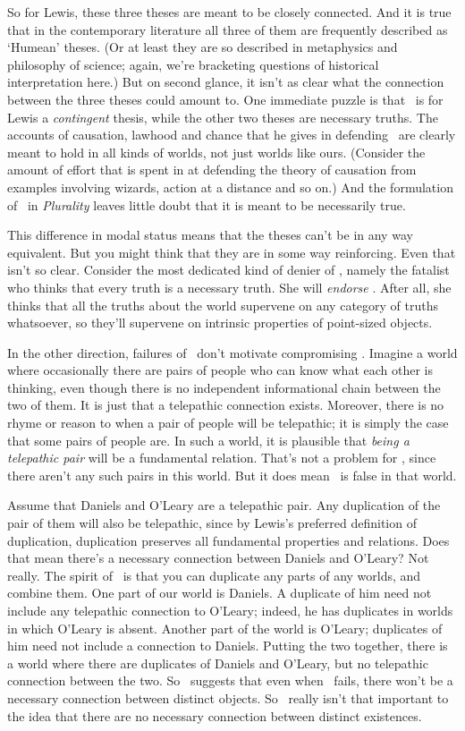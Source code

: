 \noindent So for Lewis, these three theses  are meant to be closely connected.  And it is true that in the contemporary literature all three of them are frequently described as `Humean' theses. (Or at least they are so described in metaphysics and philosophy of science; again, we're bracketing questions of historical interpretation here.) But on second glance, it isn't as clear what the connection between the three theses could amount to. One immediate puzzle is that \HS\ is for Lewis a \textit{contingent} thesis, while the other two theses are necessary truths. The accounts of causation, lawhood and chance that he gives in defending \NR\ are clearly meant to hold in all kinds of worlds, not just worlds like ours. (Consider the amount of effort that is spent in \citet{Lewis2004a} at defending the theory of causation from examples involving wizards, action at a distance and so on.) And  the formulation of \MC\ in \textit{Plurality} leaves  little doubt that it is meant to be necessarily true.

This difference in modal status means that the theses can't be in any way equivalent. But you might think that they are in some way reinforcing. Even that isn't so clear. Consider the most dedicated kind of denier of \MC, namely the fatalist who thinks that every truth is a necessary truth. She will \textit{endorse} \HS. After all, she thinks that all the truths about the world supervene on any category of truths whatsoever, so they'll supervene on intrinsic properties of point-sized objects.

In the other direction, failures of \HS\ don't motivate compromising \MC. Imagine a world where occasionally there are pairs of people who can know what each other is thinking, even though there is no independent informational chain between the two of them. It is just that a telepathic connection exists. Moreover, there is no rhyme or reason to when a pair of people will be telepathic; it is simply the case that some pairs of people are. In such a world, it is plausible that \textit{being a telepathic pair} will be a fundamental relation. That's not a problem for \HS, since there aren't any such pairs in this world. But it does mean \HS\ is false in that world.

Assume that Daniels and O'Leary are a telepathic pair. Any duplication of the pair of them will also be telepathic, since by Lewis's preferred definition of duplication, duplication preserves all fundamental properties and relations. Does that mean there's a necessary connection between Daniels and O'Leary? Not really. The spirit of \MC\ is that you can duplicate any parts of any worlds, and combine them. One part of our world is Daniels. A duplicate of him need not include any telepathic connection to O'Leary; indeed, he has duplicates in worlds in which O'Leary is absent. Another part of the world is O'Leary; duplicates of him need not include a connection to Daniels. Putting the two together, there is a world where there are duplicates of Daniels and O'Leary, but no telepathic connection between the two. So \MC\ suggests that even when \HS\ fails, there won't be a necessary connection between distinct objects. So \HS\ really isn't that important to the idea that there are no necessary connection between distinct existences.

